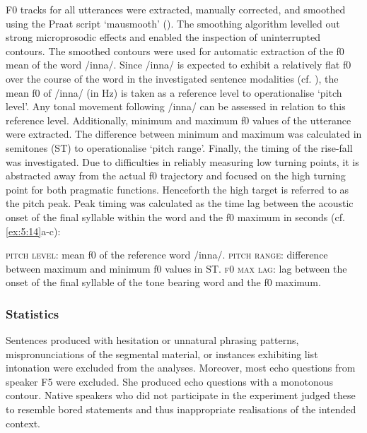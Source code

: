 F0 tracks for all utterances were extracted, manually corrected, and smoothed using the Praat script ‘mausmooth’ (\citealt{Mausmooth2015}). The smoothing algorithm levelled out strong microprosodic effects and enabled the inspection of uninterrupted contours. The smoothed contours were used for automatic extraction of the f0 mean of the word /inna/. Since /inna/ is expected to exhibit a relatively flat f0 over the course of the word in the investigated sentence modalities (cf. ), the mean f0 of /inna/ (in Hz) is taken as a reference level to operationalise ‘pitch level’. Any tonal movement following /inna/ can be assessed in relation to this reference level. Additionally, minimum and maximum f0 values of the utterance were extracted. The difference between minimum and maximum was calculated in semitones (ST) to operationalise ‘pitch range’. Finally, the timing of the rise-fall was investigated. Due to difficulties in reliably measuring low turning points, it is abstracted away from the actual f0 trajectory and focused on the high turning point for both pragmatic functions. Henceforth the high target is referred to as the pitch peak. Peak timing was calculated as the time lag between the acoustic onset of the final syllable within the word and the f0 maximum in seconds (cf. \ref{ex:5:14}a-c):

\begin{exe}
\ex\label{ex:5:14} \begin{xlist}
                \ex\label{ex:5:14a} \textsc{pitch level}: mean f0 of the reference word /inna/.
                \ex\label{ex:5:14b} \textsc{pitch range}: difference between maximum and minimum f0 values in ST.
                \ex\label{ex:5:14c} \textsc{f0 max lag}: lag between the onset of the final syllable of the tone bearing word and the f0 maximum. 
\end{xlist}
\end{exe} 

\subsubsection{Statistics}
Sentences produced with hesitation or unnatural phrasing patterns, mispronunciations of the segmental material, or instances exhibiting list intonation were excluded from the analyses. Moreover, most echo questions from speaker F5 were excluded. She produced echo questions with a monotonous contour. Native speakers who did not participate in the experiment judged these to resemble bored statements and thus inappropriate realisations of the intended context. 

